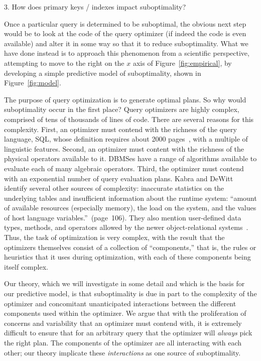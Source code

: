 3. How does primary keys / indexes impact suboptimality?


Once a particular query is determined to be suboptimal, the obvious
next step would be to look at the code of the query optimizer (if
indeed the code is even available) and alter it in some way so that it
to reduce suboptimality. What we have done instead is to approach this
phenomenon from a scientific perspective, attempting to move to the
right on the $x$ axis of Figure~\ref{fig:empirical}, by developing a
simple predictive model of suboptimality, shown in
Figure~\ref{fig:model}.

The purpose of query optimization is to generate optimal plans.  So
why would suboptimality occur in the first place? Query optimizers are
highly complex, comprised of tens of thousands of lines of code. There
are several reasons for this complexity. First, an optimizer must
contend with the richness of the query language, SQL, whose definition
requires about 2000 pages~\cite{SQL2008}, with a multiple of
linguistic features. Second, an optimizer must content with the
richness of the physical operators available to it. DBMSes have a
range of algorithms available to evaluate each of many algebraic
operators. Third, the optimizer must contend with an exponential
number of query evaluation plans. Kabra and DeWitt~\cite{kabra98}
identify several other sources of complexity: inaccurate statistics on
the underlying tables and insufficient information about the runtime
system: ``amount of available resources (especially memory), the load
on the system, and the values of host language
variables.''~(page~106). They also mention user-defined data types,
methods, and operators allowed by the newer object-relational
systems~\cite{Melton03}. Thus, the task of optimization is very
complex, with the result that the optimizers themselves consist of a
collection of ``components,'' that is, the rules or heuristics that it
uses during optimization, with each of these components being itself
complex.

Our theory, which we will investigate in some detail and which is the
basis for our predictive model, is that suboptimality is due in part
to the complexity of the optimizer and concomitant unanticipated
interactions between the different components used within the 
optimizer.  We argue that with the proliferation of concerns and
variability that an optimizer must contend with, it is extremely
difficult to ensure that for an arbitrary query that the optimizer
will {\em always} pick the right plan. The components of the optimizer
are all interacting with each other; our theory implicate these {\em
interactions} as one source of suboptimality.

